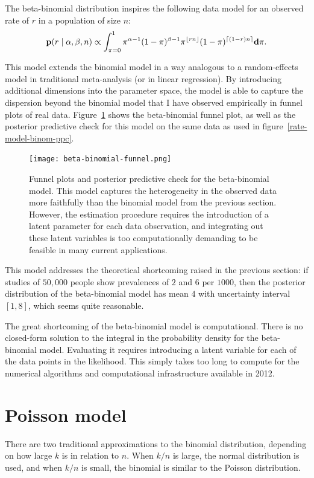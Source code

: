 The beta-binomial distribution inspires the following data model for
an observed rate of $r$ in a population of size $n$:
\[
\mathbf{p}(r\;|\; \alpha, \beta, n) \propto
\int_{\pi=0}^1 \pi^{\alpha-1}(1-\pi)^{\beta-1}
\pi^{\lfloor rn\rfloor} (1-\pi)^{\lceil (1-r)n\rceil} \mathbf{d}\pi.
\]

This model extends the binomial model in a way analogous to a random-effects
model in traditional meta-analysis\cite{borenstein_introduction_2011} (or in linear regression\cite{Rabe-Hesketh_Multilevel_2008}).  By introducing additional
dimensions into the parameter space, the model is able to capture the
dispersion beyond the binomial model that I have observed empirically
in funnel plots of real data.
Figure~\ref{rate-model-beta-binomial-funnel} shows the beta-binomial funnel
plot, as well as the posterior predictive check for
this model on the same data as used in
figure~\ref{rate-model-binom-ppc}.

\begin{figure}[ht]
\begin{center}
\texttt{[image: beta-binomial-funnel.png]}
\end{center}
\caption{Funnel plots and posterior predictive check for the beta-binomial
  model. This model captures the heterogeneity in the observed data
  more faithfully than the binomial model from the previous section.
  However, the estimation procedure requires the introduction of a latent
  parameter for each data observation, and integrating out these
  latent variables is too computationally demanding to be feasible in
  many current applications.}
\label{rate-model-beta-binomial-funnel}
\end{figure}

This model addresses the theoretical shortcoming raised in the
previous section: if studies of $50,000$ people show prevalences of
$2$ and $6$ per $1000$, then the posterior distribution of the
beta-binomial model has mean $4$ with uncertainty interval $[1,8]$,
which seems quite reasonable.

The great shortcoming of the beta-binomial model is computational.
There is no closed-form solution to the integral in the probability
density for the beta-binomial model.  Evaluating it requires
introducing a latent variable for each of the data points in the
likelihood.  This simply takes too long to compute for the numerical
algorithms and computational infrastructure available in 2012.

\section{Poisson model}
There are two traditional approximations to the binomial distribution,
depending on how large $k$ is in relation to $n$.  When $k/n$ is
large, the normal distribution is used, and when $k/n$ is small, the
binomial is similar to the Poisson distribution.

